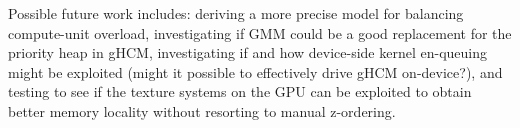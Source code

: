 \documentclass[11pt]{article}       %
\begin{document}
Possible future work includes: deriving a more precise model for balancing compute-unit overload, investigating if GMM could be a good replacement for the priority heap in gHCM, investigating if and how device-side kernel en-queuing might be exploited (might it possible to effectively drive gHCM on-device?), and testing to see if the texture systems on the GPU can be exploited to obtain better memory locality without resorting to manual z-ordering.

\nocite{rouy1992viscosity}
\nocite{kim2001levelset}
\nocite{bak2010some} %
\nocite{blelloch90prefixsums}



\end{document}

